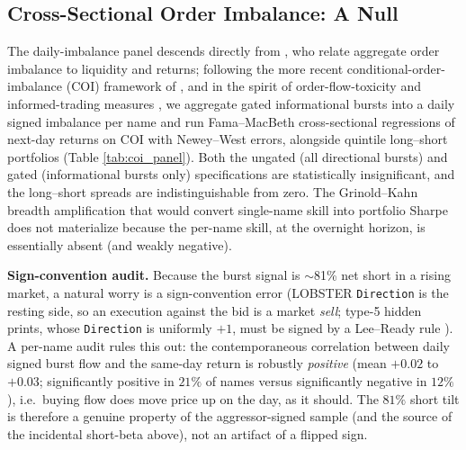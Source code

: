 \documentclass[11pt]{article}
\begin{document}
\subsection{Cross-Sectional Order Imbalance: A Null}
The daily-imbalance panel descends directly from \citet{chordia2002}, who relate aggregate order imbalance to liquidity and returns; following the more recent conditional-order-imbalance (COI) framework of \citet{lrc2024}, and in the spirit of order-flow-toxicity and informed-trading measures \citep{easley1996,easley2012}, we aggregate gated informational bursts into a daily signed imbalance per name and run Fama--MacBeth \citep{famamacbeth1973} cross-sectional regressions of next-day returns on COI with Newey--West \citep{neweywest1987} errors, alongside quintile long--short portfolios (Table \ref{tab:coi_panel}). Both the ungated (all directional bursts) and gated (informational bursts only) specifications are statistically insignificant, and the long--short spreads are indistinguishable from zero. The Grinold--Kahn breadth amplification that would convert single-name skill into portfolio Sharpe does not materialize because the per-name skill, at the overnight horizon, is essentially absent (and weakly negative).

\textbf{Sign-convention audit.} Because the burst signal is $\sim$81\% net short in a rising market, a natural worry is a sign-convention error (LOBSTER \texttt{Direction} is the resting side, so an execution against the bid is a market \emph{sell}; type-5 hidden prints, whose \texttt{Direction} is uniformly $+1$, must be signed by a Lee--Ready rule \citep{leeready1991}). A per-name audit rules this out: the contemporaneous correlation between daily signed burst flow and the same-day return is robustly \emph{positive} (mean $+0.02$ to $+0.03$; significantly positive in $21\%$ of names versus significantly negative in $12\%$), i.e.\ buying flow does move price up on the day, as it should. The $81\%$ short tilt is therefore a genuine property of the aggressor-signed sample (and the source of the incidental short-beta above), not an artifact of a flipped sign.
\end{document}
